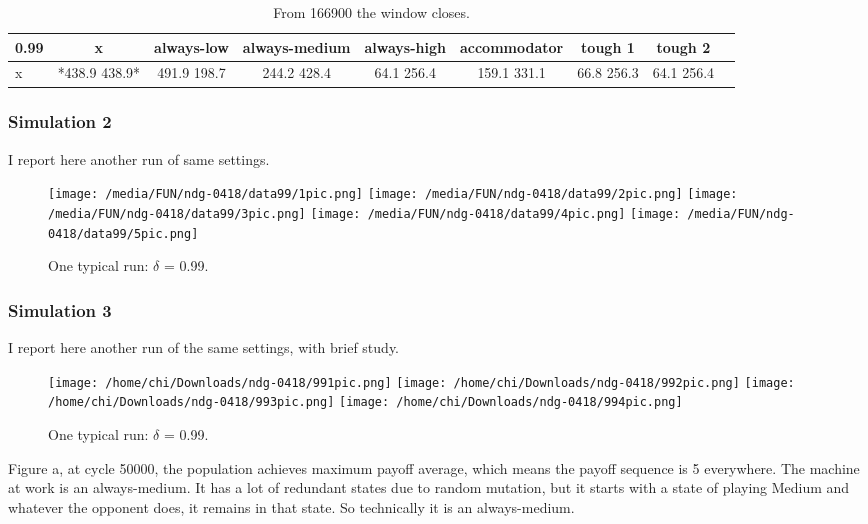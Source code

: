 \documentclass[12.5pt]{report}
\begin{document}
\begin{table}[h!]
\center
\begin{tabular}{l|cccccccc}
\textbf{0.99}& x & always-low & always-medium & always-high & accommodator &tough 1 & tough 2\\
\hline
x& *438.9 438.9* &  491.9 198.7  &  244.2 428.4   & 64.1 256.4 &    159.1 331.1 &   66.8 256.3 &    64.1 256.4\\

\end{tabular}
\caption{From 166900 the window closes.}
\end{table}



\subsubsection{Simulation 2}

I report here another run of same settings.

\begin{figure}
\texttt{[image: /media/FUN/ndg-0418/data99/1pic.png]}
\texttt{[image: /media/FUN/ndg-0418/data99/2pic.png]}
\texttt{[image: /media/FUN/ndg-0418/data99/3pic.png]}
\texttt{[image: /media/FUN/ndg-0418/data99/4pic.png]}
\texttt{[image: /media/FUN/ndg-0418/data99/5pic.png]}
\caption{One typical run: $\delta$ = 0.99.}
\end{figure}


\subsubsection{Simulation 3}

I report here another run of the same settings, with brief study.

\begin{figure}

\texttt{[image: /home/chi/Downloads/ndg-0418/991pic.png]}
\texttt{[image: /home/chi/Downloads/ndg-0418/992pic.png]}
\texttt{[image: /home/chi/Downloads/ndg-0418/993pic.png]}
\texttt{[image: /home/chi/Downloads/ndg-0418/994pic.png]}

\caption{One typical run: $\delta$ = 0.99.}
\end{figure}

Figure a, at cycle 50000, the population achieves maximum payoff average, which means the payoff sequence is 5 everywhere. The machine at work is an always-medium. It has a lot of redundant states due to random mutation, but it starts with a state of playing Medium and whatever the opponent does, it remains in that state. So technically it is an always-medium.\\
\end{document}

